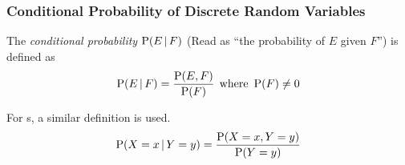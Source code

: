 \subsubsection{Conditional Probability of  Discrete Random Variables}\label{subsubsec:Conditional_Probability_Discrete_Random_Variables}
\begin{definition}\label{def:Conditional_Probability}
  The \emph{conditional probability} $\operatorname{\operatorname{P}}(E \operatorname{\vert} F)$ (Read as ``the probability of $E$ given $F$'') is defined as
  \begin{equation}\label{eq:Conditional_Probability}
    \operatorname{\operatorname{P}}(E \operatorname{\vert} F) = \frac{\operatorname{\operatorname{P}}(E,F)}{\operatorname{\operatorname{P}}(F)} \:\: \text{where } \operatorname{\operatorname{P}}(F) \neq 0
  \end{equation}

  For s, a similar definition is used.
  \begin{equation}\label{eq:Conditional_Probability_Random_Variables}
    \operatorname{\operatorname{P}}(X=x \operatorname{\vert} Y=y) = \frac{\operatorname{\operatorname{P}}(X=x, Y=y)}{\operatorname{\operatorname{P}}(Y=y)}
  \end{equation}
\end{definition}

